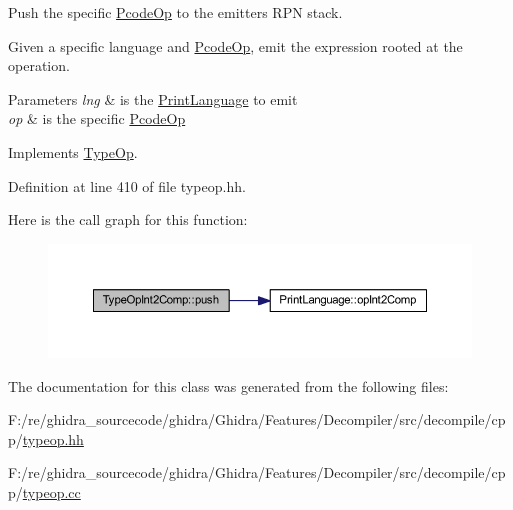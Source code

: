 Push the specific \mbox{\hyperlink{class_pcode_op}{Pcode\+Op}} to the emitter\textquotesingle{}s R\+PN stack. 

Given a specific language and \mbox{\hyperlink{class_pcode_op}{Pcode\+Op}}, emit the expression rooted at the operation. 
\begin{DoxyParams}{Parameters}
{\em lng} & is the \mbox{\hyperlink{class_print_language}{Print\+Language}} to emit \\
\hline
{\em op} & is the specific \mbox{\hyperlink{class_pcode_op}{Pcode\+Op}} \\
\hline
\end{DoxyParams}


Implements \mbox{\hyperlink{class_type_op_ac9c9544203ed74dabe6ac662b653b2af}{Type\+Op}}.



Definition at line 410 of file typeop.\+hh.

Here is the call graph for this function\+:
\nopagebreak
\begin{figure}[H]
\begin{center}
\leavevmode
\includegraphics[width=350pt]{class_type_op_int2_comp_a4be303917727668a8290533e71352070_cgraph}
\end{center}
\end{figure}


The documentation for this class was generated from the following files\+:\begin{DoxyCompactItemize}
\item 
F\+:/re/ghidra\+\_\+sourcecode/ghidra/\+Ghidra/\+Features/\+Decompiler/src/decompile/cpp/\mbox{\hyperlink{typeop_8hh}{typeop.\+hh}}\item 
F\+:/re/ghidra\+\_\+sourcecode/ghidra/\+Ghidra/\+Features/\+Decompiler/src/decompile/cpp/\mbox{\hyperlink{typeop_8cc}{typeop.\+cc}}\end{DoxyCompactItemize}
